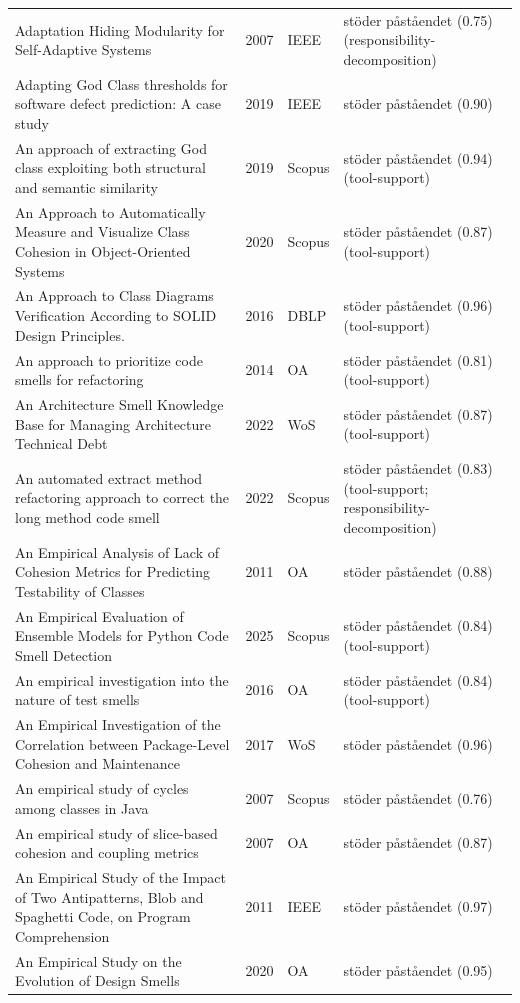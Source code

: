 \begin{longtable}{@{}%
  >{\raggedright\arraybackslash}p{}c%
  >{\raggedright\arraybackslash}p{}%
  >{\raggedright\arraybackslash}p{}@{}}
Adaptation Hiding Modularity for Self-Adaptive Systems & 2007 & IEEE & stöder påståendet (0.75) (responsibility-decomposition) \\
Adapting God Class thresholds for software defect prediction: A case study & 2019 & IEEE & stöder påståendet (0.90) \\
An approach of extracting God class exploiting both structural and semantic similarity & 2019 & Scopus & stöder påståendet (0.94) (tool-support) \\
An Approach to Automatically Measure and Visualize Class Cohesion in Object-Oriented Systems & 2020 & Scopus & stöder påståendet (0.87) (tool-support) \\
An Approach to Class Diagrams Verification According to SOLID Design Principles. & 2016 & DBLP & stöder påståendet (0.96) (tool-support) \\
An approach to prioritize code smells for refactoring & 2014 & OA & stöder påståendet (0.81) (tool-support) \\
An Architecture Smell Knowledge Base for Managing Architecture Technical Debt & 2022 & WoS & stöder påståendet (0.87) (tool-support) \\
An automated extract method refactoring approach to correct the long method code smell & 2022 & Scopus & stöder påståendet (0.83) (tool-support; responsibility-decomposition) \\
An Empirical Analysis of Lack of Cohesion Metrics for Predicting Testability of Classes & 2011 & OA & stöder påståendet (0.88) \\
An Empirical Evaluation of Ensemble Models for Python Code Smell Detection & 2025 & Scopus & stöder påståendet (0.84) (tool-support) \\
An empirical investigation into the nature of test smells & 2016 & OA & stöder påståendet (0.84) (tool-support) \\
An Empirical Investigation of the Correlation between Package-Level Cohesion and Maintenance & 2017 & WoS & stöder påståendet (0.96) \\
An empirical study of cycles among classes in Java & 2007 & Scopus & stöder påståendet (0.76) \\
An empirical study of slice-based cohesion and coupling metrics & 2007 & OA & stöder påståendet (0.87) \\
An Empirical Study of the Impact of Two Antipatterns, Blob and Spaghetti Code, on Program Comprehension & 2011 & IEEE & stöder påståendet (0.97) \\
An Empirical Study on the Evolution of Design Smells & 2020 & OA & stöder påståendet (0.95) \\

\end{longtable}
